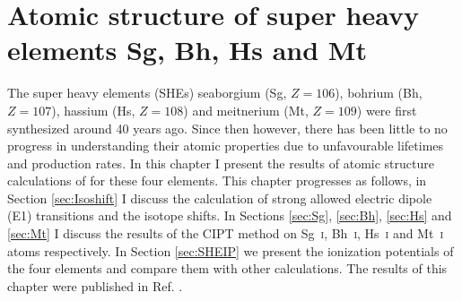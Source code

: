 \documentclass[10pt,a4paper, twoside, openright]{report}
\begin{document}
\chapter{Atomic structure of super heavy elements Sg, Bh, Hs and Mt} \label{chap:106}
The super heavy elements (SHEs) seaborgium (Sg, $Z=106$), bohrium (Bh, $Z=107$), hassium (Hs, $Z=108$) and meitnerium (Mt, $Z=109$) were first synthesized around 40 years ago. Since then however, there has been little to no progress in understanding their atomic properties due to unfavourable lifetimes and production rates. In this chapter I present the results of atomic structure calculations of for these four elements. This chapter progresses as follows, in Section \ref{sec:Isoshift} I discuss the calculation of strong allowed electric dipole (E1) transitions and the isotope shifts. In Sections  \ref{sec:Sg}, \ref{sec:Bh}, \ref{sec:Hs} and \ref{sec:Mt} I discuss the results of the CIPT method on  Sg~\textsc{i}, Bh~\textsc{i}, Hs~\textsc{i} and Mt~\textsc{i} atoms respectively.  In Section \ref{sec:SHEIP} we present the ionization potentials of the four elements and compare them with other calculations.  The results of this chapter were published in Ref. \cite{LDFSg2019}.
\end{document}
